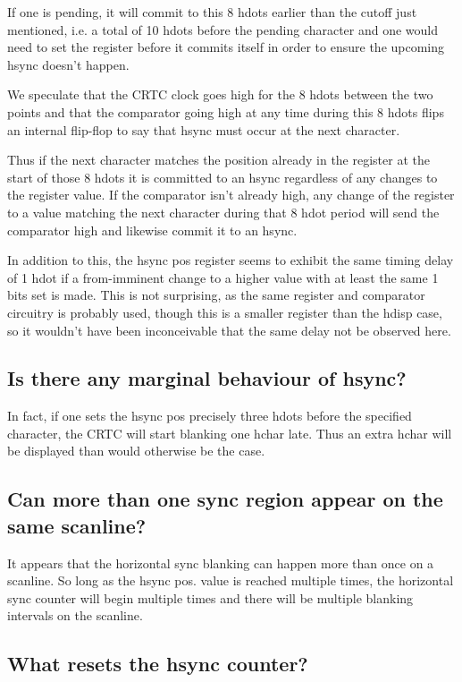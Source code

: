 \documentclass[a4paper,10pt]{amsart}
\begin{document}
If one is pending, it will commit to this 8 hdots earlier than the cutoff just
mentioned, i.e. a total of 10 hdots before the pending character and one would
need to set the register before it commits itself in order to ensure the
upcoming hsync doesn't happen.

We speculate that the CRTC clock goes high for the 8 hdots between the two
points and that the comparator going high at any time during this 8 hdots flips
an internal flip-flop to say that hsync must occur at the next character.

Thus if the next character matches the position already in the register at the
start of those 8 hdots it is committed to an hsync regardless of any changes to
the register value. If the comparator isn't already high, any change of the
register to a value matching the next character during that 8 hdot period will
send the comparator high and likewise commit it to an hsync.

In addition to this, the hsync pos register seems to exhibit the same timing
delay of 1 hdot if a from-imminent change to a higher value with at least the
same 1 bits set is made. This is not surprising, as the same register and
comparator circuitry is probably used, though this is a smaller register than
the hdisp case, so it wouldn't have been inconceivable that the same delay not
be observed here.

\subsection{Is there any marginal behaviour of hsync?}

In fact, if one sets the hsync pos precisely three hdots before the specified
character, the CRTC will start blanking one hchar late. Thus an extra hchar
will be displayed than would otherwise be the case.

\subsection{Can more than one sync region appear on the same scanline?}

It appears that the horizontal sync blanking can happen more than once on a
scanline. So long as the hsync pos. value is reached multiple times, the
horizontal sync counter will begin multiple times and there will be multiple
blanking intervals on the scanline.

\subsection{What resets the hsync counter?}
\end{document}
